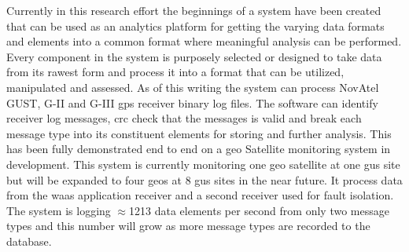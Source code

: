 Currently in this research effort the beginnings of a system have been created that can be used as an analytics platform for getting the varying data formats and elements into a common format where meaningful analysis can be performed.  Every component in the system is purposely selected or designed to take data from its rawest form and process it into a format that can be utilized, manipulated and assessed. As of this writing the system can process NovAtel GUST, G-II and G-III \ac{gps} receiver binary log files. The software can identify receiver log messages, \ac{crc} check that the messages is valid and break each message type into its constituent elements for storing and further analysis. This has been fully demonstrated end to end on a \ac{geo} Satellite monitoring system in development. This system is currently monitoring one \ac{geo} satellite at one \ac{gus} site but will be expanded to four \ac{geo}s at 8 \ac{gus} sites in the near future. It process data from the \ac{waas} application receiver and a second receiver used for fault isolation. The system is logging $\approx$1213 data elements per second from only two message types and this number will grow as more message types are recorded to the database.
